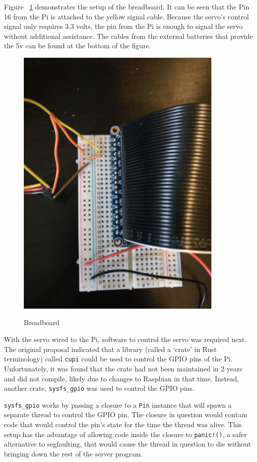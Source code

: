 \documentclass[a4paper]{article}
\begin{document}
Figure ~\ref{fig:breadboard} demonstrates the setup of the breadboard.
It can be seen that the Pin 16 from the Pi is attached to the yellow signal cable.
Because the servo's control signal only requires 3.3 volts, the pin from the Pi is enough to signal the servo without additional assistance.
The cables from the external batteries that provide the 5v can be found at the bottom of the figure.

\begin{figure}[H]
    \center
    \caption{Breadboard}
    \includegraphics[width=10cm]{breadboard.jpg}
    \label{fig:breadboard}
\end{figure}



With the servo wired to the Pi, software to control the servo was required next.
The original proposal indicated that a library (called a `crate' in Rust terminology) called \texttt{cupi} could be used to control the GPIO pins of the Pi.
Unfortunately, it was found that the crate had not been maintained in 2 years and did not compile, likely due to changes to Raspbian in that time.
Instead, another crate, \texttt{sysfs\_gpio} was used to control the GPIO pins.

\texttt{sysfs\_gpio} works by passing a closure to a \texttt{Pin} instance that will spawn a separate thread to control the GPIO pin.
The closure in question would contain code that would control the pin's state for the time the thread was alive.
This setup has the advantage of allowing code inside the closure to \texttt{panic!()}, a safer alternative to segfaulting, that would cause the thread in question to die without bringing down the rest of the server program.
\end{document}
